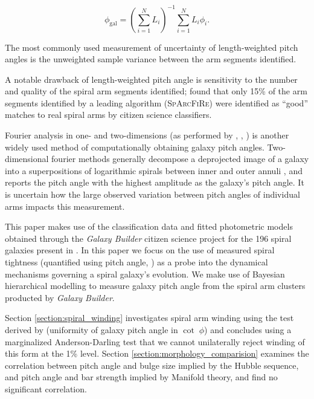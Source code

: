 \begin{equation}
  \phi_\mathrm{gal} = \left(\sum_{i=1}^{N}L_i\right)^{-1}\sum_{i=1}^{N}L_i \phi_i.
\end{equation}

The most commonly used measurement of uncertainty of length-weighted pitch angles is the unweighted sample variance between the arm segments identified.

A notable drawback of length-weighted pitch angle is sensitivity to the number and quality of the spiral arm segments identified; \citet{2017MNRAS.472.2263H} found that only 15\% of the arm segments identified by a leading algorithm (\textsc{SpArcFiRe}) were identified as ``good'' matches to real spiral arms by citizen science classifiers.

Fourier analysis in one- and two-dimensions (as performed by \citealt{2019arXiv190804246D}, \citealt{2012ApJS..199...33D}, \citealt{2018MNRAS.474.2594M}) is another widely used method of computationally obtaining galaxy pitch angles. Two-dimensional fourier methods generally decompose a deprojected image of a galaxy into a superpositions of logarithmic spirals between inner and outer annuli \citep{2012ApJS..199...33D}, and reports the pitch angle with the highest amplitude as the galaxy's pitch angle. It is uncertain how the large observed variation between pitch angles of individual arms impacts this measurement.

This paper makes use of the classification data and fitted photometric models obtained through the \textit{Galaxy Builder} citizen science project for the 196 spiral galaxies present in \Lingard. In this paper we focus on the use of measured spiral tightness (quantified using pitch angle, \citealt{1987gady.book.....B}) as a probe into the dynamical mechanisms governing a spiral galaxy's evolution. We make use of Bayesian hierarchical modelling to measure galaxy pitch angle from the spiral arm clusters producted by \textit{Galaxy Builder}.

Section \ref{section:spiral_winding} investigates spiral arm winding using the test derived by \cite{2019arXiv190910291P} (uniformity of galaxy pitch angle in $\cot\;\phi$) and concludes using a marginalized Anderson-Darling test that we cannot unilaterally reject winding of this form at the 1\% level. Section \ref{section:morphology_comparision} examines the correlation between pitch angle and bulge size implied by the Hubble sequence, and pitch angle and bar strength implied by Manifold theory, and find no significant correlation.

